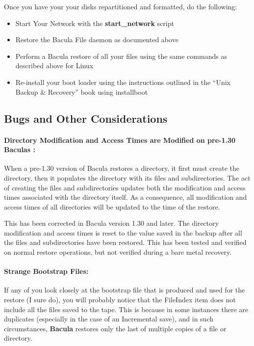 Once you have your your disks repartitioned and formatted, do the following: 

\begin{itemize}
\item Start Your Network with the {\bf start\_network} script  
\item Restore the Bacula File daemon as documented above  
\item Perform a Bacula restore of all your files using the same  commands as
   described above for Linux  
\item Re-install your boot loader using the instructions outlined  in the
   ``Unix Backup \& Recovery'' book  using installboot 
   \end{itemize}

\label{genbugs}

\subsection*{Bugs and Other Considerations}

\paragraph*{Directory Modification and Access Times are Modified on pre-1.30
Baculas :}

When a pre-1.30 version of Bacula restores a directory, it first must create
the directory, then it populates the directory with its files and
subdirectories. The act of creating the files and subdirectories updates both
the modification and access times associated with the directory itself. As a
consequence, all modification and access times of all directories will be
updated to the time of the restore. 

This has been corrected in Bacula version 1.30 and later. The directory
modification and access times is reset to the value saved in the backup after
all the files and subdirectories have been restored. This has been tested and
verified on normal restore operations, but not verified during a bare metal
recovery. 

\paragraph*{Strange Bootstrap Files:}

If any of you look closely at the bootstrap file that is produced and used for
the restore (I sure do), you will probably notice that the FileIndex item does
not include all the files saved to the tape. This is because in some instances
there are duplicates (especially in the case of an Incremental save), and in
such circumstances, {\bf Bacula} restores only the last of multiple copies of
a file or directory. 
\label{Win3233}

